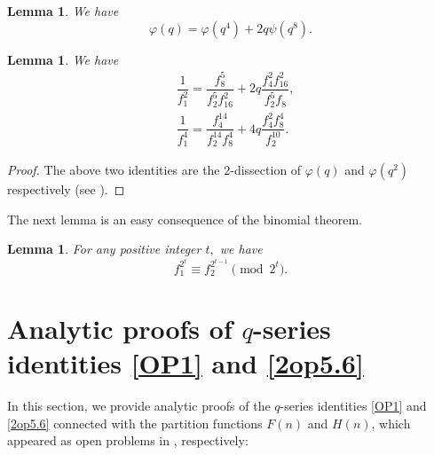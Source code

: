 \documentclass[12pt]{article}
\numberwithin{equation}{section}
\newtheorem{lemma}[theorem]{Lemma}
\theoremstyle{definition}
\theoremstyle{remark}
\numberwithin{equation}{section}
\begin{document}
\begin{lemma}\cite{BBC} We have
\begin{equation}\label{P5}
\varphi(q)=\varphi(q^4)+2q\psi(q^8).
\end{equation}    
\end{lemma}

\begin{lemma} We have
   \begin{align}
&\label{P6}\dfrac{1}{f_1^2}
=
\dfrac{f_8^5}{f_2^5f_{16}^2}
+
2q\dfrac{f_4^2f_{16}^2}{f_2^5f_8},\\
&\label{P7}\dfrac{1}{f_1^4}
=
\dfrac{f_4^{14}}{f_2^{14}f_8^4}
+
4q\dfrac{f_4^2f_8^4}{f_2^{10}}.
\end{align}
\end{lemma}
\begin{proof}
    The above two identities are the $2$-dissection of $\varphi(q)$ and $\varphi(q^2)$ respectively (see \cite[Eqs. (1.9.4) and (1.10.1)]{md}).
\end{proof}
The next lemma is an easy consequence of the binomial theorem.
\begin{lemma}For any positive integer $t,$ we have 
\begin{equation}\label{2t}
    f_1^{2^t}\equiv f_{2}^{2^{t-1}}\pmod{2^t}. 
\end{equation}   
\end{lemma}


\section{Analytic proofs of $q$-series identities \eqref{OP1} and \eqref{2op5.6}}
In this section, we provide analytic proofs of the \(q\)-series identities \eqref{OP1} and \eqref{2op5.6} connected with the partition functions  \( F(n) \) and \( H(n) \), which appeared as open problems in  \cite[p. 10-11, (5.3) and (5.6)] {2clr}, respectively:\\
\end{document}
